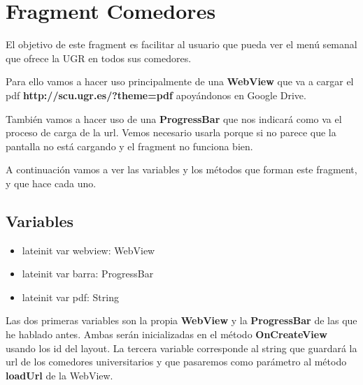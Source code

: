 \documentclass[a4paper,11pt]{article}
\begin{document}
\section{Fragment Comedores}

\vspace{5 mm}

El objetivo de este fragment es facilitar al usuario que pueda ver el menú semanal que ofrece la UGR en todos sus comedores.

Para ello vamos a hacer uso principalmente de una \textbf{WebView} que va a cargar el pdf \textbf{http://scu.ugr.es/?theme=pdf} apoyándonos en Google Drive. 

\vspace{5 mm}

También vamos a hacer uso de una \textbf{ProgressBar} que nos indicará como va el proceso de carga de la url. Vemos necesario usarla porque si no parece que la pantalla no está cargando y el fragment no funciona bien.

\vspace{5 mm}

A continuación vamos a ver las variables y los métodos que forman este fragment, y que hace cada uno. 

\vspace{5 mm}

\subsection{Variables}

\vspace{5 mm}

\begin{itemize}

\item{lateinit var webview: WebView}
\item{lateinit var barra: ProgressBar}
\item{lateinit var pdf: String}

\end{itemize}

Las dos primeras variables son la propia \textbf{WebView} y la \textbf{ProgressBar} de las que he hablado antes. Ambas serán inicializadas en el método \textbf{OnCreateView} usando los id del layout. 
La tercera variable corresponde al string que guardará la url de los comedores universitarios y que pasaremos como parámetro al método \textbf{loadUrl} de la WebView.

\newpage
\end{document}
